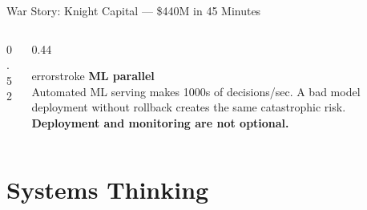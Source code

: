 \documentclass[aspectratio=169, 12pt]{beamer}
\begin{document}
\begin{frame}{War Story: Knight Capital --- \$440M in 45 Minutes}
\begin{columns}[T]
\begin{column}{0.52\textwidth}
    \vspace{0.1cm}
  \end{column}
  \begin{column}{0.44\textwidth}
    \vspace{0.2cm}
    \begin{mlsyscard}{errorstroke}
    \textbf{ML parallel}\\[0.1cm]
    {\footnotesize Automated ML serving makes 1000s of decisions/sec. A bad model deployment without rollback creates the same catastrophic risk. \textbf{Deployment and monitoring are not optional.}}
    \end{mlsyscard}
  \end{column}
\end{columns}

\end{frame}

\section{Systems Thinking}
\end{document}
